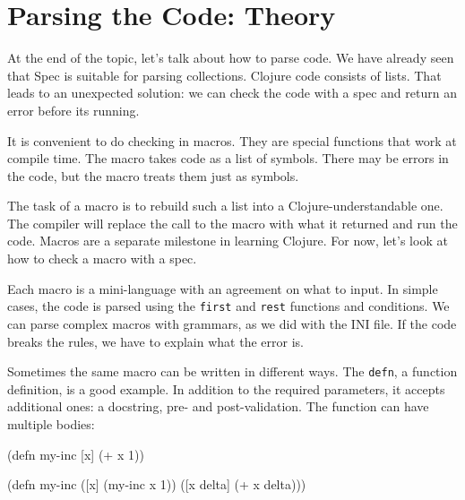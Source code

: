 \section{Parsing the Code: Theory}


At the end of the topic, let's talk about how to parse code. We have already seen that Spec is suitable for parsing collections. Clojure code consists of lists. That leads to an unexpected solution: we can check the code with a spec and return an error before its running.

It is convenient to do checking in macros. They are special functions that work at compile time. The macro takes code as a list of symbols. There may be errors in the code, but the macro treats them just as symbols.

The task of a macro is to rebuild such a list into a Clojure-understandable one. The compiler will replace the call to the macro with what it returned and run the code. Macros are a separate milestone in learning Clojure. For now, let's look at how to check a macro with a spec.

Each macro is a mini-language with an agreement on what to input. In simple cases, the code is parsed using the \verb|first| and \verb|rest| functions and conditions. We can parse complex macros with grammars, as we did with the INI file. If the code breaks the rules, we have to explain what the error is.

Sometimes the same macro can be written in different ways. The \verb|defn|, a function definition, is a good example. In addition to the required parameters, it accepts additional ones: a docstring, pre- and post-validation. The function can have multiple bodies:

\ifx\DEVICETYPE\MOBILE

\begin{english}
  \begin{clojure}
(defn my-inc
  [x]
  (+ x 1))
  \end{clojure}

\splitter


\splitter

  \begin{clojure}
(defn my-inc
  ([x]
   (my-inc x 1))
  ([x delta]
   (+ x delta)))
  \end{clojure}
\end{english}

